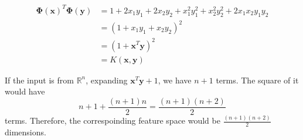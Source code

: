 \documentclass{article}[11pt]
\begin{document}
\section{}
\begin{align*}
  \boldsymbol{\Phi}(\mathbf{x})^T \boldsymbol{\Phi}(\mathbf{y}) &= 1 + 2x_1y_1 + 2x_2y_2 + x_1^2y_1^2 + x_2^2y_2^2 + 2x_1x_2y_1y_2 \\
  &= (1 + x_1y_1 + x_2y_2)^2 \\
  &= (1 + \mathbf{x}^T\mathbf{y}) ^ 2 \\
  &= K(\mathbf{x}, \mathbf{y})
\end{align*}

If the input is from $\mathbb{R}^n$, expanding $\mathbf{x}^T\mathbf{y} + 1$, we have $n+1$ terms. The square of it would have \[ n + 1 + \frac{(n+1)n}{2} = \frac{(n+1)(n+2)}{2} \] terms. Therefore, the correspoinding feature space would be $\frac{(n+1)(n+2)}{2}$ dimensions.

\section{}
\end{document}
